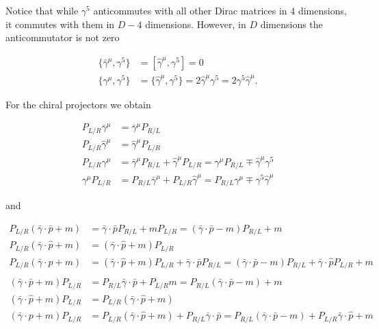\documentclass[../FeynCalcManual.tex]{subfiles}
\begin{document}
Notice that while \(\gamma^5\) anticommutes with all other Dirac
matrices in \(4\) dimensions, it commutes with them in \(D-4\)
dimensions. However, in \(D\) dimensions the anticommutator is not zero

\begin{align}
\{ \bar{\gamma}^\mu, \gamma^5 \} &=[ \hat{\gamma}^\mu, \gamma^5 ] = 0 \\
\{ \gamma^\mu, \gamma^5 \} & = \{ \hat{\gamma}^\mu, \gamma^5 \}= 2 \hat{\gamma}^\mu \gamma^5 = 2 \gamma^5 \hat{\gamma}^\mu.
\end{align}

For the chiral projectors we obtain

\begin{align}
P_{L/R} \bar{\gamma}^\mu  & = \bar{\gamma}^\mu P_{R/L} \\
P_{L/R} \hat{\gamma}^\mu  &= \hat{\gamma}^\mu P_{L/R} \\
P_{L/R} \gamma^\mu  & = \bar{\gamma}^\mu P_{R/L} + \hat{\gamma}^\mu P_{L/R} = \gamma^\mu P_{R/L} \mp \hat{\gamma}^\mu \gamma^5 \\
\gamma^\mu P_{L/R}  & =  P_{R/L} \bar{\gamma}^\mu +  P_{L/R} \hat{\gamma}^\mu = P_{R/L} \gamma^\mu  \mp \gamma^5 \hat{\gamma}^\mu
\end{align}

and

\begin{align}
P_{L/R} (\bar{\gamma} \cdot \bar{p} + m) &= \bar{\gamma} \cdot \bar{p} P_{R/L} + m P_{L/R} = (\bar{\gamma} \cdot \bar{p} - m) P_{R/L}  + m \\
P_{L/R} (\bar{\gamma} \cdot \hat{p} + m) & = (\bar{\gamma} \cdot \hat{p} + m) P_{L/R} \\
P_{L/R} (\bar{\gamma} \cdot p + m) &= (\bar{\gamma} \cdot \hat{p} + m) P_{L/R} + \bar{\gamma} \cdot \bar{p} P_{R/L} =
(\bar{\gamma} \cdot \bar{p} - m) P_{R/L} + \bar{\gamma} \cdot \hat{p} P_{L/R} + m \\ \nonumber \\ \nonumber
 (\bar{\gamma} \cdot \bar{p} + m) P_{L/R} &= P_{R/L} \bar{\gamma} \cdot \bar{p}  + P_{L/R} m  = P_{R/L} (\bar{\gamma} \cdot \bar{p} - m)   + m \\
(\bar{\gamma} \cdot \hat{p} + m) P_{L/R}  & = P_{L/R}  (\bar{\gamma} \cdot \hat{p} + m) \\
 (\bar{\gamma} \cdot p + m) P_{L/R} &=  P_{L/R} ( \bar{\gamma} \cdot \hat{p} + m) + P_{R/L} \bar{\gamma} \cdot \bar{p}  =
P_{R/L} (\bar{\gamma} \cdot \bar{p} - m)  + P_{L/R} \bar{\gamma} \cdot \hat{p}  + m
\end{align}
\end{document}
